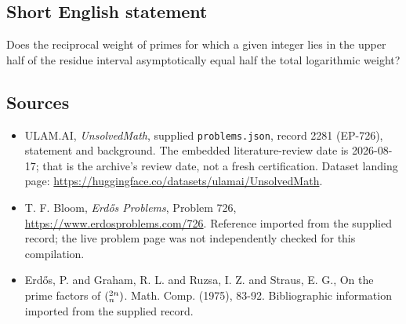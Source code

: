 \documentclass[11pt,a4paper]{article}
\begin{document}
\subsection{Short English statement}

Does the reciprocal weight of primes for which a given integer lies in the upper half of the residue interval asymptotically equal half the total logarithmic weight?

\subsection{Sources}

{\small

\begin{itemize}

\item[\hypertarget{source:2281:1}{S1}] ULAM.AI, \emph{UnsolvedMath}, supplied \texttt{problems.json}, record 2281 (EP-726), statement and background. The embedded literature-review date is 2026-08-17; that is the archive’s review date, not a fresh certification. Dataset landing page: \url{https://huggingface.co/datasets/ulamai/UnsolvedMath}.

\item[\hypertarget{source:2281:2}{S2}] T. F. Bloom, \emph{Erdős Problems}, Problem 726, \url{https://www.erdosproblems.com/726}. Reference imported from the supplied record; the live problem page was not independently checked for this compilation.

\item[\hypertarget{source:2281:3}{S3}] Erd\H{o}s, P. and Graham, R. L. and Ruzsa, I. Z. and Straus, E. G., On the prime factors of $(\sp{2n}\sb{n})$. Math. Comp. (1975), 83-92. Bibliographic information imported from the supplied record.

\end{itemize}

}

\label{end:2281}
\end{document}
